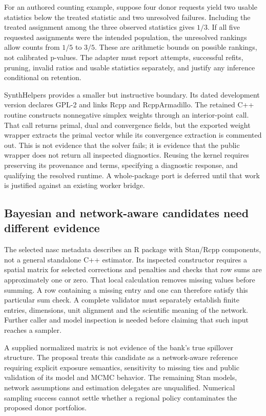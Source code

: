 For an authored counting example, suppose four donor requests yield two
usable statistics below the treated statistic and two unresolved failures.
Including the treated assignment among the three observed statistics gives
$1/3$. If all five requested assignments were the intended population,
the unresolved rankings allow counts from $1/5$ to $3/5$. These are arithmetic
bounds on possible rankings, not calibrated p-values. The adapter must
report attempts, successful refits, pruning, invalid ratios and usable
statistics separately, and justify any inference conditional on retention.
\citep{exec25_synthcross_choice}

SynthHelpers provides a smaller but instructive boundary. Its dated
development version declares GPL-2 and links Rcpp and RcppArmadillo.
The retained C++ routine constructs nonnegative simplex weights through
an interior-point call. That call returns primal, dual and convergence
fields, but the exported weight wrapper extracts the primal vector while
its convergence extraction is commented out. This is not evidence that
the solver fails; it is evidence that the public wrapper does not return
all inspected diagnostics. Reusing the kernel requires preserving its
provenance and terms, specifying a diagnostic response, and qualifying
the resolved runtime. A whole-package port is deferred until that work is
justified against an existing worker bridge.\citep{exec25_synthcross_helpers}

\subsection{Bayesian and network-aware candidates need different evidence}
The selected nasc metadata describes an R package with Stan/Rcpp components,
not a general standalone C++ estimator. Its inspected constructor requires
a spatial matrix for selected corrections and penalties and checks that
row sums are approximately one or zero. That local calculation removes
missing values before summing. A row containing a missing entry and one
can therefore satisfy this particular sum check. A complete validator must
separately establish finite entries, dimensions, unit alignment and the
scientific meaning of the network. Further caller and model inspection
is needed before claiming that such input reaches a sampler.
\citep{exec25_synthcross_nasc,exec25_synthcross_choice}

A supplied normalized matrix is not evidence of the bank's true spillover
structure. The proposal treats this candidate as a network-aware reference
requiring explicit exposure semantics, sensitivity to missing ties and
public validation of its model and MCMC behavior. The remaining Stan models,
network assumptions and estimation delegates are unqualified. Numerical
sampling success cannot settle whether a regional policy contaminates
the proposed donor portfolios.\citep{exec25_synthcross_choice}

